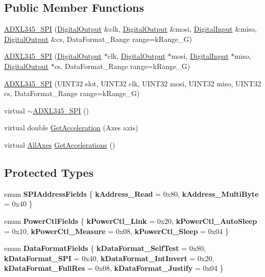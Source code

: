 \subsection*{\-Public \-Member \-Functions}
\begin{DoxyCompactItemize}
\item 
\hyperlink{classADXL345__SPI_a56b03c68f1cff2963acd666f3de5e376}{\-A\-D\-X\-L345\-\_\-\-S\-P\-I} (\hyperlink{classDigitalOutput}{\-Digital\-Output} \&clk, \hyperlink{classDigitalOutput}{\-Digital\-Output} \&mosi, \hyperlink{classDigitalInput}{\-Digital\-Input} \&miso, \hyperlink{classDigitalOutput}{\-Digital\-Output} \&cs, \-Data\-Format\-\_\-\-Range range=k\-Range\-\_\-G)
\item 
\hyperlink{classADXL345__SPI_ab4e2856be2cdf061cedb9948e8394f66}{\-A\-D\-X\-L345\-\_\-\-S\-P\-I} (\hyperlink{classDigitalOutput}{\-Digital\-Output} $\ast$clk, \hyperlink{classDigitalOutput}{\-Digital\-Output} $\ast$mosi, \hyperlink{classDigitalInput}{\-Digital\-Input} $\ast$miso, \hyperlink{classDigitalOutput}{\-Digital\-Output} $\ast$cs, \-Data\-Format\-\_\-\-Range range=k\-Range\-\_\-G)
\item 
\hyperlink{classADXL345__SPI_a244c03e2234472d4f4b05342ed5bd17d}{\-A\-D\-X\-L345\-\_\-\-S\-P\-I} (\-U\-I\-N\-T32 slot, \-U\-I\-N\-T32 clk, \-U\-I\-N\-T32 mosi, \-U\-I\-N\-T32 miso, \-U\-I\-N\-T32 cs, \-Data\-Format\-\_\-\-Range range=k\-Range\-\_\-G)
\item 
virtual \hyperlink{classADXL345__SPI_a1f906ecfc18f026b7f7163d8c8aedc53}{$\sim$\-A\-D\-X\-L345\-\_\-\-S\-P\-I} ()
\item 
virtual double \hyperlink{classADXL345__SPI_acae8aee7785e91d4efe1e695478ca727}{\-Get\-Acceleration} (\-Axes axis)
\item 
virtual \hyperlink{structADXL345__SPI_1_1AllAxes}{\-All\-Axes} \hyperlink{classADXL345__SPI_abbd9ef138325c23402189fde28aa61c3}{\-Get\-Accelerations} ()
\end{DoxyCompactItemize}
\subsection*{\-Protected \-Types}
\begin{DoxyCompactItemize}
\item 
enum {\bfseries \-S\-P\-I\-Address\-Fields} \{ {\bfseries k\-Address\-\_\-\-Read} = 0x80, 
{\bfseries k\-Address\-\_\-\-Multi\-Byte} = 0x40
 \}
\item 
enum {\bfseries \-Power\-Ctl\-Fields} \{ {\bfseries k\-Power\-Ctl\-\_\-\-Link} = 0x20, 
{\bfseries k\-Power\-Ctl\-\_\-\-Auto\-Sleep} = 0x10, 
{\bfseries k\-Power\-Ctl\-\_\-\-Measure} = 0x08, 
{\bfseries k\-Power\-Ctl\-\_\-\-Sleep} = 0x04
 \}
\item 
enum {\bfseries \-Data\-Format\-Fields} \{ \*
{\bfseries k\-Data\-Format\-\_\-\-Self\-Test} = 0x80, 
{\bfseries k\-Data\-Format\-\_\-\-S\-P\-I} = 0x40, 
{\bfseries k\-Data\-Format\-\_\-\-Int\-Invert} = 0x20, 
{\bfseries k\-Data\-Format\-\_\-\-Full\-Res} = 0x08, 
\*
{\bfseries k\-Data\-Format\-\_\-\-Justify} = 0x04
 \}
\end{DoxyCompactItemize}
